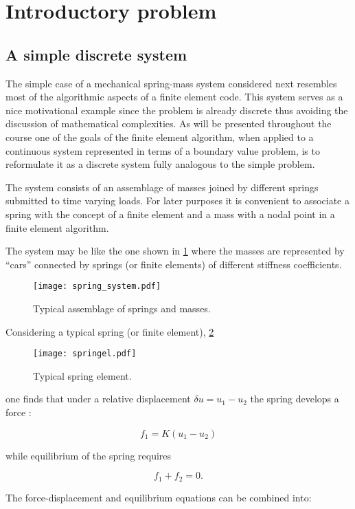 \section*{Introductory problem}
\subsection*{A simple discrete system}
The simple case of a mechanical spring-mass system considered next resembles most of the algorithmic aspects of a finite element code. This system serves as a nice motivational example since the problem is already discrete thus avoiding the discussion of mathematical complexities. As will be presented throughout the course one of the goals of the finite element algorithm, when applied to a continuous system represented in terms of a boundary value problem, is to reformulate it as a discrete system fully analogous to the simple problem.

The system consists of an assemblage of masses joined by different springs submitted to time varying loads. For later purposes it is convenient to associate a spring with the concept of a finite element and a mass with a nodal point in a finite element algorithm.

The system may be like the one shown in \cref{fig:bathe} where the masses are 
represented by ``cars'' connected by springs (or finite elements) of different 
stiffness coefficients.

\begin{figure}[h]
\centering
\texttt{[image: spring\_system.pdf]}
\caption{Typical assemblage of springs and masses.}
\label{fig:bathe}
\end{figure}


Considering a typical spring (or finite element), \cref{fig:springel}

\begin{figure}[h]
\centering
\texttt{[image: springel.pdf]}
\caption{Typical spring element.}
\label{fig:springel}
\end{figure}

one finds that under a relative displacement $\delta u = u_1 - u_2$  the spring develops a force :

\[f_1 = K(u_1 - u_2)\]

while equilibrium of the spring requires

\[f_1 + f_2 = 0.\]

The force-displacement and equilibrium equations can be combined into:

